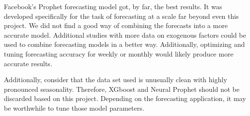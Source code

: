 \documentclass[16pt,twocolumn,letterpaper,titlepage]{article}
\begin{document}
Facebook's Prophet forecasting model got, by far, the best results. It was developed specifically for the task of forecasting at a scale far beyond even this project. We did not find a good way of combining the forecasts into a more accurate model. Additional studies with more data on exogenous factors could be used to combine forecasting models in a better way. Additionally, optimizing and tuning forecasting accuracy for weekly or monthly would likely produce more accurate results. 

Additionally, consider that the data set used is unusually clean with highly pronounced seasonality. Therefore, XGboost and Neural Prophet should not be discarded based on this project. Depending on the forecasting application, it may be worthwhile to tune those model parameters.



\clearpage
\onecolumn


\end{document}
